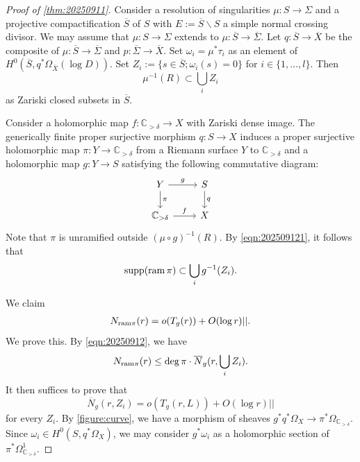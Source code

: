 \documentclass[11pt,english]{smfart}
\theoremstyle{plain}
\theoremstyle{definition}
\theoremstyle{remark}
\numberwithin{equation}{section}
\theoremstyle{plain}
\newcommand{\bC}{\mathbb{C}}
\newcommand{\ram}{{\rm ram}\,}
\begin{document}
\begin{proof}[Proof of \cref{thm:20250911}]
Consider a resolution of singularities $\mu:  S\to \Sigma$ and a projective compactification $\overline{S}$ of $S$ with $E:=\overline{S}\backslash S$ a simple normal crossing divisor.
We may assume that $\mu:S\to\Sigma$ extends to $\mu:\overline{S}\to\overline{\Sigma}$.
Let $q:\overline{S}\to\overline{X}$ be the composite of $\mu:\overline{S}\to \overline{\Sigma}$ and $p:\overline{\Sigma}\to\overline{X}$.
Set $\omega_i=\mu^*\tau_i$ as an element of $H^0(\overline{S}, q^*\Omega_{\overline{X}}(\log D))$.
Set $Z_{i}:=\{s\in \overline{S}; \omega_i(s)=0\}$ for $i\in\{1,\ldots, l\}$.
Then
\begin{equation}\label{eqn:202509121}
\mu^{-1}(R)\subset \bigcup_{i} Z_{i}
\end{equation}
as Zariski closed subsets in $\overline{S}$.

Consider a holomorphic map $f:\bC_{>\delta}\to X$ with Zariski dense image.  The generically finite proper surjective morphism $q:S\to X$ induces a proper surjective holomorphic map   $\pi:Y\to \bC_{>\delta}$  from a Riemann surface $Y$ to  $\bC_{>\delta}$ and  a holomorphic map $g:Y\to S$  satisfying the following commutative diagram:
\begin{equation}\label{figure:curve}
 	\begin{tikzcd}
	Y\arrow[r, "g"] \arrow[d, "\pi"] & S\arrow[d, "q"]\\
	\bC_{>\delta}\arrow[r, "f"] & X
\end{tikzcd}
\end{equation}
Note that $\pi$ is unramified outside $(\mu\circ g)^{-1}(R)$.    
 By \eqref{eqn:202509121}, it follows that 
 \begin{equation}\label{eqn:20250912}
\mathrm{supp} ( \ram \pi)\subset \bigcup_{i}g^{-1}(Z_{i}).
 \end{equation}
 

We claim
\begin{align}\label{eq:ramification}
	 	N_{{\rm ram} \pi}(r) =o( T_{g}(r)) + O(\log r) ||.
\end{align} 
We prove this.
By \eqref{eqn:20250912}, we have 
	\begin{align*}
		N_{{\rm ram}\pi }(r)\leq \deg \pi \cdot 	\overline{N}_g(r, \bigcup_{i}Z_{i}).  
	\end{align*}
	It then suffices to prove that 
	$$\overline{N}_g(r,  Z_{i})= o(T_{g}(r, L))+O(\log r)||$$ 
	for every  $Z_{i}$. 
	By \eqref{figure:curve}, we have a morphism of sheaves $g^*q^*\Omega_X\to \pi^*\Omega_{\mathbb C_{>\delta}}$.
 Since $\omega_i\in H^0(S, q^*\Omega_{X})$, we may consider $g^*\omega_i$ as a holomorphic section of $\pi^*\Omega^1_{\mathbb C_{>\delta}}$. 
	

\end{proof}
\end{document}
